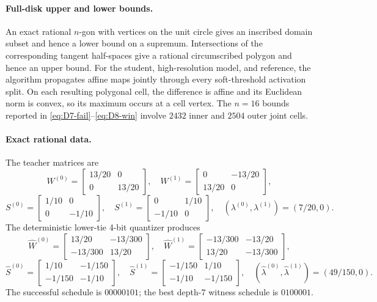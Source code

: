 \documentclass[twoside,11pt]{article}
\begin{document}
\paragraph{Full-disk upper and lower bounds.}
An exact rational $n$-gon with vertices on the unit circle gives an inscribed domain subset and hence a lower bound on a supremum.  Intersections of the corresponding tangent half-spaces give a rational circumscribed polygon and hence an upper bound.  For the student, high-resolution model, and reference, the algorithm propagates affine maps jointly through every soft-threshold activation split.  On each resulting polygonal cell, the difference is affine and its Euclidean norm is convex, so its maximum occurs at a cell vertex.  The $n=16$ bounds reported in \eqref{eq:D7-fail}--\eqref{eq:D8-win} involve $2432$ inner and $2504$ outer joint cells.

\paragraph{Exact rational data.}
The teacher matrices are
\[
W^{(0)}=\begin{bmatrix}13/20&0\\0&13/20\end{bmatrix},\quad
W^{(1)}=\begin{bmatrix}0&-13/20\\13/20&0\end{bmatrix},
\]
\[
S^{(0)}=\begin{bmatrix}1/10&0\\0&-1/10\end{bmatrix},\quad
S^{(1)}=\begin{bmatrix}0&1/10\\-1/10&0\end{bmatrix},\quad
(\lambda^{(0)},\lambda^{(1)})=(7/20,0).
\]
The deterministic lower-tie 4-bit quantizer produces
\[
\widehat W^{(0)}=\begin{bmatrix}13/20&-13/300\\-13/300&13/20\end{bmatrix},\quad
\widehat W^{(1)}=\begin{bmatrix}-13/300&-13/20\\13/20&-13/300\end{bmatrix},
\]
\[
\widehat S^{(0)}=\begin{bmatrix}1/10&-1/150\\-1/150&-1/10\end{bmatrix},\quad
\widehat S^{(1)}=\begin{bmatrix}-1/150&1/10\\-1/10&-1/150\end{bmatrix},\quad
(\widehat\lambda^{(0)},\widehat\lambda^{(1)})=(49/150,0).
\]
The successful schedule is $00000101$; the best depth-$7$ witness schedule is $0100001$.
\end{document}
